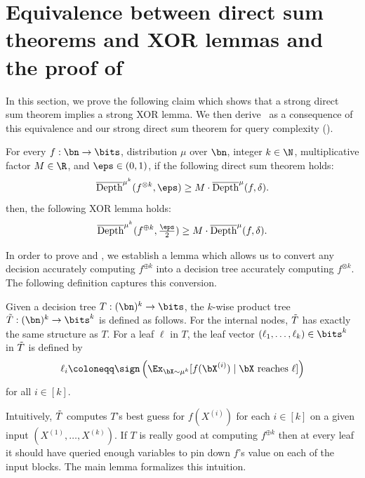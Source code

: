 \documentclass[11pt]{article}
\newcommand{\lnote}[1]{\footnote{{\bf \color{blue}Li-Yang}: {#1}}}
\begin{document}
\section{Equivalence between direct sum theorems and XOR lemmas and the proof of~}

In this section, we prove the following claim which shows that a strong direct sum theorem implies a strong XOR lemma. We then derive~ as a consequence of this equivalence and our strong direct sum theorem for query complexity ().

\begin{claim}
\label{claim:equivalence between direct product and XOR}
For every $f:\bn\to\bits$, distribution $\mu$ over $\bn$, integer $k\in\N$, multiplicative factor $M \in \R$, and $\eps\in (0,1)$, if the following direct sum theorem holds:
$$
\overline{\mathrm{Depth}}^{\mu^k}(f^{\otimes k},\eps)\ge M\cdot\overline{\mathrm{Depth}}^{\mu}(f,\delta).
$$
then, the following XOR lemma holds:
$$
\overline{\mathrm{Depth}}^{\mu^k}(f^{\oplus k},\tfrac{\eps}{2})\ge M\cdot\overline{\mathrm{Depth}}^{\mu}(f,\delta).
$$
\end{claim}

In order to prove  and , we establish a lemma which allows us to convert any decision accurately computing $f^{\oplus k}$ into a decision tree accurately computing $f^{\otimes k}$. The following definition captures this conversion.

\begin{definition}
\label{def:product tree}
    Given a decision tree $T:(\bn)^k \to \bits$, the $k$-wise product tree $\Tilde{T}:(\bn)^k \to \bits^k$ is defined as follows. For the internal nodes, $\Tilde{T}$ has exactly the same structure as $T$. For a leaf $\ell$ in $T$, the leaf vector $(\ell_1,\ldots,\ell_k)\in\bits^k$ in $\Tilde{T}$ is defined by
    $$
    \ell_i\coloneqq\sign\left(\Ex_{\bX\sim\mu^{k}}[f(\bX^{(i)})\mid \bX\text{ reaches }\ell]\right)
    $$
    for all $i\in[k]$.
\end{definition}

Intuitively, $\Tilde{T}$ computes $T$'s best guess for $f(X^{(i)})$ for each $i\in [k]$ on a given input $(X^{(1)},\ldots,X^{(k)})$. If $T$ is really good at computing $f^{\oplus k}$ then at every leaf it should have queried enough variables to pin down $f$'s value on each of the input blocks. The main lemma formalizes this intuition.
\end{document}
